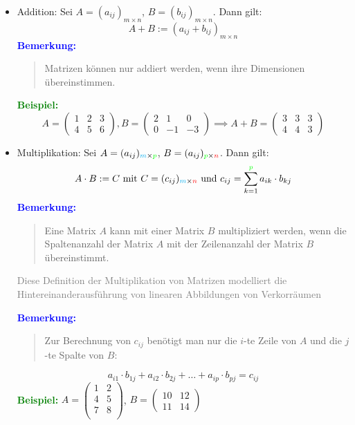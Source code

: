 \documentclass{article}
\newcommand{\red}[1]{\textcolor{red}{#1}}
\newcommand{\gray}[1]{\textcolor{gray}{#1}}
\newcommand{\blue}[1]{\textcolor{blue}{#1}}
\newcommand{\green}[1]{\textcolor{green}{#1}}
\newcommand{\cyan}[1]{\textcolor{cyan}{#1}}
\newcommand{\ex}{\green{\textbf{Beispiel: }}}
\newcommand{\an}[1]{\blue{\textbf{Bemerkung: }}\begin{quote}#1\end{quote}}
\begin{document}
\begin{itemize}
    \item Addition: Sei $A = (a_{ij})_{m \times n}$, $B = (b_{ij})_{m \times n}$. Dann gilt:
    \begin{equation*}
        A + B := (a_{ij} + b_{ij})_{m \times n}
    \end{equation*}
    \an{Matrizen können nur addiert werden, wenn ihre Dimensionen übereinstimmen.}
    \ex
    \begin{equation*}
        A = \begin{pmatrix}
            1 & 2 & 3 \\
            4 & 5 & 6
        \end{pmatrix},
        B = \begin{pmatrix}
            2 & 1 & 0 \\
            0 & -1 & -3
        \end{pmatrix}
        \implies
        A + B = \begin{pmatrix}
            3 & 3 & 3\\
            4 & 4 & 3
        \end{pmatrix}
    \end{equation*}

    \item Multiplikation: Sei $A = (a_{ij})_{\cyan{m} \times \green{p}}$, $B = (a_{ij})_{\green{p} \times \red{n}}$. Dann gilt:
    \begin{equation*}
        A \cdot B := C \text{ mit } C = (c_{ij})_{\cyan{m} \times \red{n}} \text{ und } c_{ij} = \sum_{k = 1}^{\green{p}} a_{ik} \cdot b_{kj}
    \end{equation*}
    \an{Eine Matrix $A$ kann mit einer Matrix $B$ multipliziert werden, wenn die Spaltenanzahl der Matrix $A$ mit der Zeilenanzahl der Matrix $B$ übereinstimmt.}
    \gray{Diese Definition der Multiplikation von Matrizen modelliert die Hintereinanderausführung von linearen Abbildungen von Verkorräumen}

    \an{Zur Berechnung von $c_{ij}$ benötigt man nur die $i$-te Zeile von $A$ und die $j$-te Spalte von $B$:}
    \begin{equation*}
        a_{i1} \cdot b_{1j} + a_{i2} \cdot b_{2j} + \dots + a_{ip} \cdot b_{pj} = c_{ij}
    \end{equation*}
    \ex
    $A = \begin{pmatrix}
        1 & 2\\
        4 & 5\\
        7 & 8\\
    \end{pmatrix}$,
    $B = \begin{pmatrix}
        10 & 12\\
        11 & 14
    \end{pmatrix}$


\end{itemize}
\end{document}
